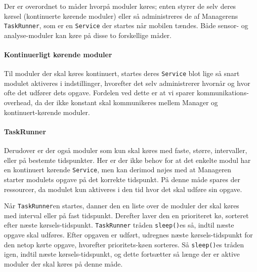 Der er overordnet to måder hvorpå moduler køres; enten styrer de selv deres kørsel (kontinuerte kørende moduler) eller så administreres de af Managerens \texttt{TaskRunner}, som er en \texttt{Service} der startes når mobilen tændes.
Både sensor- og analyse-moduler kan køre på disse to forskellige måder.

\paragraph{Kontinuerligt kørende moduler}
Til moduler der skal køres kontinuert, startes deres \texttt{Service} blot lige så snart modulet aktiveres i indstillinger, hvorefter det selv administrerer hvornår og hvor ofte det udfører dets opgave.
Fordelen ved dette er at vi sparer kommunikations-overhead, da der ikke konstant skal kommunikeres mellem Manager og kontinuert-kørende moduler.

\paragraph{TaskRunner}
Derudover er der også moduler som kun skal køres med faste, større, intervaller, eller på bestemte tidspunkter.
Her er der ikke behov for at det enkelte modul har en kontinuert kørende \texttt{Service}, men kan derimod nøjes med at Manageren starter modulets opgave på det korrekte tidspunkt.
På denne måde spares der ressourcer, da modulet kun aktiveres i den tid hvor det skal udføre sin opgave. 

Når \texttt{TaskRunner}en startes, danner den en liste over de moduler der skal køres med interval eller på fast tidspunkt.
Derefter laver den en prioriteret kø, sorteret efter næste kørsels-tidspunkt.
\texttt{TaskRunner} tråden \texttt{sleep()}es så, indtil næste opgave skal udføres.
Efter opgaven er udført, udregnes næste kørsels-tidspunkt for den netop kørte opgave, hvorefter prioritets-køen sorteres.
Så \texttt{sleep()}es tråden igen, indtil næste kørsels-tidspunkt, og dette fortsætter så længe der er aktive moduler der skal køres på denne måde.
